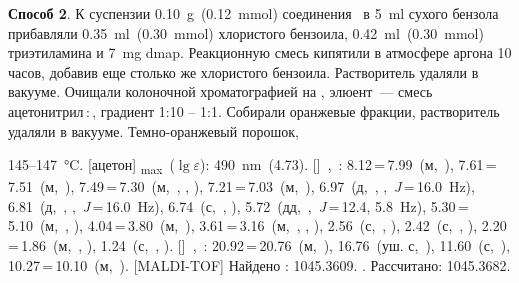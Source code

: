 \textbf{Способ 2}. К суспензии \SI{0.10}{\gram}~(\SI{0.12}{\mmol}) соединения~\textbf{} в \SI{5}{\milli\litre} сухого бензола прибавляли \SI{0.35}{\milli\litre}~(\SI{0.30}{\mmol}) хлористого бензоила, \SI{0.42}{\milli\litre}~(\SI{0.30}{\mmol}) триэтиламина и \SI{7}{\milli\gram} \ac{dmap}.
Реакционную смесь кипятили в атмосфере аргона 10 часов, добавив еще столько же хлористого бензоила.
Растворитель удаляли в вакууме. Очищали колоночной хроматографией на , элюент~--- смесь ацетонитрил\,:\,, градиент 1:10 -- 1:1.
Собирали оранжевые фракции, растворитель удаляли в вакууме. Темно-оранжевый порошок, 
\begin{experimental}
     145--\SI{147}{\celsius}.
    [ацетон] \chemlambda\textsubscript{max}~($\lg \varepsilon$): \SI{490}{\nano\metre}~(4.73).
    []~\chemdelta,~\si{\ppm}: 8.12\,=\,7.99~(м,~), 7.61\,=\,7.51~(м,~), 7.49\,=\,7.30~(м,~, , ), 7.21\,=\,7.03~(м,~), 6.97~(д,~, ,~\textit{J}\,=\,16.0~\si{\hertz}), 6.81~(д,~, ,~\textit{J}\,=\,16.0~\si{\hertz}), 6.74~(с,~, ), 5.72~(дд,~,~\textit{J}\,=\,12.4, 5.8~\si{\hertz}), 5.30\,=\,5.10~(м,~, ), 4.04\,=\,3.80~(м,~), 3.61\,=\,3.16~(м,~, , ), 2.56~(с,~, ), 2.42~(с,~, ), 2.20\,=\,1.86~(м,~, ), 1.24~(с,~, ).
    []~\chemdelta,~\si{\ppm}: 20.92\,=\,20.76~(м,~), 16.76~(уш. с,~), 11.60~(с,~), 10.27\,=\,10.10~(м,~).
    [MALDI-TOF] Найдено \ce{[M + H]+}: \num{1045.3609}. . Рассчитано: \ce{[M + H]} \num{1045.3682}.
\end{experimental}

